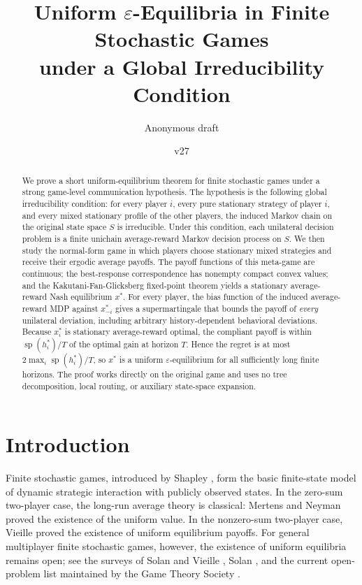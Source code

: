 \documentclass[11pt]{article}
\title{Uniform $\varepsilon$-Equilibria in Finite Stochastic Games\\under a Global Irreducibility Condition}
\author{Anonymous draft}
\date{v27}
\theoremstyle{definition}
\newcommand{\1}{\mathbf{1}}
\DeclareMathOperator{\spn}{sp}
\begin{document}
\maketitle

\begin{abstract}
We prove a short uniform-equilibrium theorem for finite stochastic games under a strong game-level communication hypothesis. The hypothesis is the following global irreducibility condition: for every player $i$, every pure stationary strategy of player $i$, and every mixed stationary profile of the other players, the induced Markov chain on the original state space $S$ is irreducible. Under this condition, each unilateral decision problem is a finite unichain average-reward Markov decision process on $S$. We then study the normal-form game in which players choose stationary mixed strategies and receive their ergodic average payoffs. The payoff functions of this meta-game are continuous; the best-response correspondence has nonempty compact convex values; and the Kakutani-Fan-Glicksberg fixed-point theorem yields a stationary average-reward Nash equilibrium $x^*$. For every player, the bias function of the induced average-reward MDP against $x^*_{-i}$ gives a supermartingale that bounds the payoff of \emph{every} unilateral deviation, including arbitrary history-dependent behavioral deviations. Because $x_i^*$ is stationary average-reward optimal, the compliant payoff is within $\spn(h_i^*)/T$ of the optimal gain at horizon $T$. Hence the regret is at most $2\max_i \spn(h_i^*)/T$, so $x^*$ is a uniform $\varepsilon$-equilibrium for all sufficiently long finite horizons. The proof works directly on the original game and uses no tree decomposition, local routing, or auxiliary state-space expansion.
\end{abstract}

\section{Introduction}

Finite stochastic games, introduced by Shapley \cite{Shapley1953}, form the basic finite-state model of dynamic strategic interaction with publicly observed states. In the zero-sum two-player case, the long-run average theory is classical: Mertens and Neyman \cite{MertensNeyman1981} proved the existence of the uniform value. In the nonzero-sum two-player case, Vieille \cite{Vieille2000a,Vieille2000b} proved the existence of uniform equilibrium payoffs. For general multiplayer finite stochastic games, however, the existence of uniform equilibria remains open; see the surveys of Solan and Vieille \cite{SolanVieille2015}, Solan \cite{Solan2022}, and the current open-problem list maintained by the Game Theory Society \cite{OpenProblems2026}.
\end{document}
